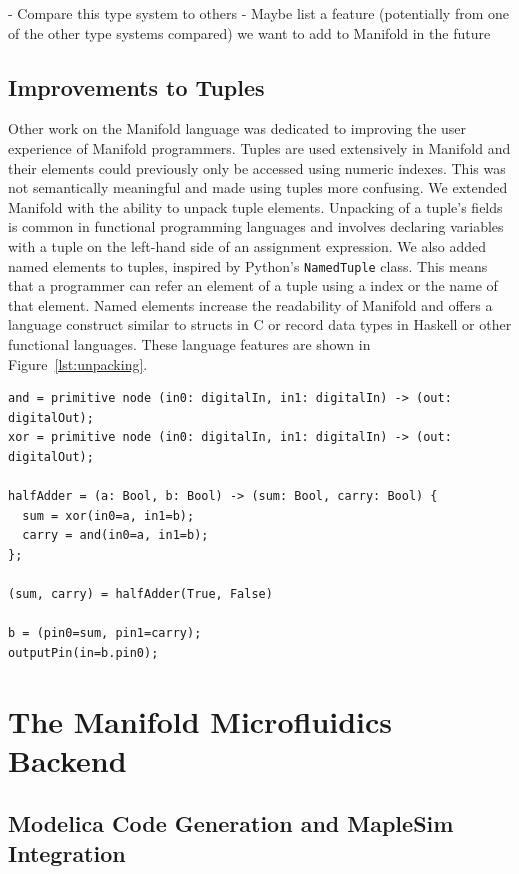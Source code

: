 - Compare this type system to others
- Maybe list a feature (potentially from one of the other type systems compared) we want to add to Manifold in the future

\subsection{Improvements to Tuples}

Other work on the Manifold language was dedicated to improving the user experience
of Manifold programmers. Tuples are used extensively in Manifold and their
elements could previously only be accessed using numeric indexes. This was not
semantically meaningful and made using tuples more confusing. We extended
Manifold with the ability to unpack tuple elements. Unpacking of a tuple's
fields is common in functional programming languages and involves declaring
variables with a tuple on the left-hand side of an assignment expression. We
also added named elements to tuples, inspired by Python's \texttt{NamedTuple}
class. This means that a programmer can refer an element of a tuple using a
index or the name of that element. Named elements increase the readability of
Manifold and offers a language construct similar to structs in C or record
data types in Haskell or other functional languages. These language features
are shown in Figure~\ref{lst:unpacking}.

\begin{lstlisting}[label=lst:unpacking, caption=A module imported into a Manifold file]
and = primitive node (in0: digitalIn, in1: digitalIn) -> (out: digitalOut);
xor = primitive node (in0: digitalIn, in1: digitalIn) -> (out: digitalOut);

halfAdder = (a: Bool, b: Bool) -> (sum: Bool, carry: Bool) {
  sum = xor(in0=a, in1=b);
  carry = and(in0=a, in1=b);
};

(sum, carry) = halfAdder(True, False)

b = (pin0=sum, pin1=carry);
outputPin(in=b.pin0);
\end{lstlisting}

\section{The Manifold Microfluidics Backend}

\subsection{Modelica Code Generation and MapleSim Integration}

